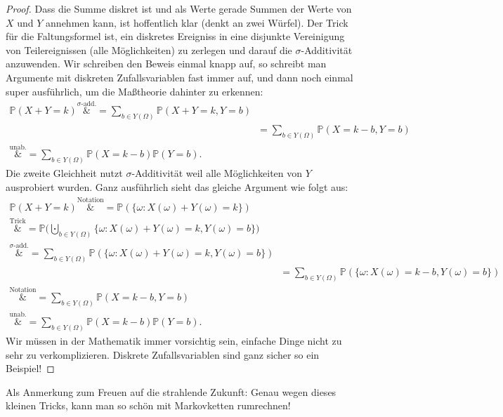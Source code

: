 \begin{proof}
	Dass die Summe diskret ist und als Werte gerade Summen der Werte von $X$ und $Y$ annehmen kann, ist hoffentlich klar (denkt an zwei W\"urfel). Der Trick f\"ur die Faltungsformel ist, ein diskretes Ereigniss in eine disjunkte Vereinigung von Teilereignissen (alle M\"oglichkeiten) zu zerlegen und darauf die $\sigma$-Additivit\"at anzuwenden. Wir schreiben den Beweis einmal knapp auf, so schreibt man Argumente mit diskreten Zufallsvariablen fast immer auf, und dann noch einmal super ausf\"uhrlich, um die Ma\ss theorie dahinter zu erkennen:	
		\begin{align*}
		\mathbb{P}(X+Y = k)	
		\overset{\sigma\text{-add.}}&{=} \sum\limits_{b \in Y(\Omega)} \mathbb{P}( X + Y = k, Y = b)\\ 
		&= \sum\limits_{b \in Y(\Omega)} \mathbb{P}( X = k-b, Y = b )\\
		 \overset{\text{unab.}}&{=} \sum\limits_{b \in Y(\Omega)} \mathbb{P}(X=k-b) \mathbb{P}(Y=b).
	\end{align*}
	Die zweite Gleichheit nutzt $\sigma$-Additivit\"at weil alle M\"oglichkeiten von $Y$ ausprobiert wurden. Ganz ausf\"uhrlich sieht das gleiche Argument wie folgt aus:	
	\begin{align*}
		\mathbb{P}(X+Y =k) \overset{\text{Notation}}&{=} \mathbb{P}(\{ \omega\colon X(\omega) + Y(\omega) = k \}) \\
		\overset{\text{Trick}}&{=} \mathbb{P}\Big(\bigcupdot_{b \in Y(\Omega)} \{ \omega\colon X(\omega) + Y(\omega) = k, Y(\omega) = b \} \Big)\\
		\overset{\sigma\text{-add.}}&{=} \sum\limits_{b \in Y(\Omega)} \mathbb{P}(\{ \omega\colon X(\omega) + Y(\omega) = k, Y(\omega) = b \})\\ 
		&= \sum\limits_{b \in Y(\Omega)} \mathbb{P}(\{ \omega\colon X(\omega) = k - b, Y(\omega) = b \})\\
		\overset{\text{Notation}}&{=} \sum\limits_{b \in Y(\Omega)} \mathbb{P}(X = k - b, Y = b )\\
		 \overset{\text{unab.}}&{=} \sum\limits_{b \in Y(\Omega)} \mathbb{P}(X=k-b) \mathbb{P}(Y=b).
	\end{align*}
	Wir m\"ussen in der Mathematik immer vorsichtig sein, einfache Dinge nicht zu sehr zu verkomplizieren. Diskrete Zufallsvariablen sind ganz sicher so ein Beispiel!
\end{proof}
Als Anmerkung zum Freuen auf die strahlende Zukunft: Genau wegen dieses kleinen Tricks, kann man so sch\"on mit Markovketten rumrechnen!\smallskip

